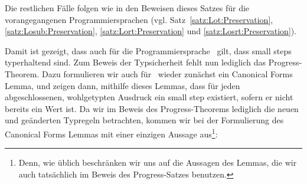 \begin{beweis}
  \PROOFCASEend
  Die restlichen F\"alle folgen wie in den Beweisen dieses Satzes f\"ur die vorangegangenen Programmiersprachen
  (vgl. Satz~\ref{satz:Lot:Preservation}, \ref{satz:Losub:Preservation}, \ref{satz:Lort:Preservation}
  und \ref{satz:Losrt:Preservation}).
\end{beweis}

Damit ist gezeigt, dass auch f\"ur die Programmiersprache \Lct\ gilt, dass small steps typerhaltend sind. Zum
Beweis der Typsicherheit fehlt nun lediglich das Progress-Theorem. Dazu formulieren wir auch f\"ur \Lct\ wieder
zun\"achst ein Canonical Forms Lemma, und zeigen dann, mithilfe dieses Lemmas, dass f\"ur jeden abgeschlossenen,
wohlgetypten Ausdruck ein small step existiert, sofern er nicht bereits ein Wert ist. Da wir im Beweis des
Progress-Theorems lediglich die neuen und ge\"anderten Typregeln betrachten, kommen wir bei der Formulierung
des Canonical Forms Lemmas mit einer einzigen Aussage aus\footnote{Denn, wie \"ublich beschr\"anken wir uns
auf die Aussagen des Lemmas, die wir auch tats\"achlich im Beweis des Progress-Satzes benutzen.}:

